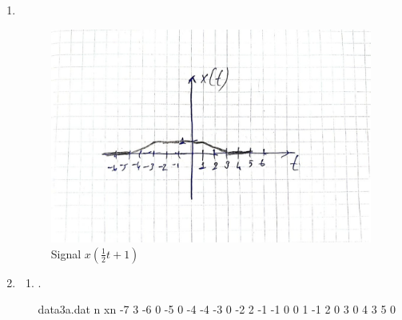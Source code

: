 \documentclass[10pt,a4paper, margin=1in]{article}
\begin{document}
\begin{enumerate}
    \item ~\\
          \begin{figure}[H]
              \centering
              \includegraphics[scale=0.25]{handwritten_signal.jpeg}
              \caption{Signal $x(\frac{1}{2}t+1)$}
          \end{figure}

    \item %
          \begin{enumerate}
              \item %
                .\\
              \begin{filecontents}{data3a.dat}
                 n   xn
                 -7   3
                 -6   0
                 -5   0
                 -4   -4
                 -3   0
                 -2   2
                 -1   -1
                 0    0
                 1    -1
                 2    0
                 3    0 
                 4    3  
                 5    0  
                \end{filecontents}


\end{enumerate}
\end{enumerate}
\end{document}
